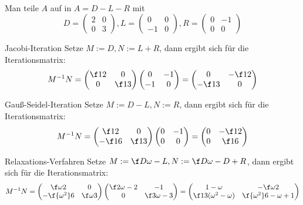 \documentclass{mywork}
\begin{document}
	\begin{aufgabe}~

		Man teile $A$ auf in $A= D - L - R$ mit
		\[
			D=\begin{pmatrix}2&0\\0&3\end{pmatrix},
			L=\begin{pmatrix}0&0\\-1&0\end{pmatrix},
			R=\begin{pmatrix}0&-1\\0&0\end{pmatrix}
		\]
		\begin{seg}{Jacobi-Iteration}
			Setze $M:=D, N:=L+R$, dann ergibt sich für die Iterationsmatrix:
			\[
				M^{-1}N = \begin{pmatrix}\f12&0\\0&\f13\end{pmatrix}\begin{pmatrix}0&-1\\-1&0\end{pmatrix} = \begin{pmatrix}0&-\f12\\-\f13&0\end{pmatrix}
			\]
		\end{seg}
		\begin{seg}{Gauß-Seidel-Iteration}
			Setze $M:=D-L, N:=R$, dann ergibt sich für die Iterationsmatrix:
			\[
				M^{-1}N = \begin{pmatrix}\f12&0\\-\f16&\f13\end{pmatrix}\begin{pmatrix}0&-1\\0&0\end{pmatrix} = \begin{pmatrix}0&-\f12\\0&\f16\end{pmatrix}
			\]
		\end{seg}
		\begin{seg}{Relaxations-Verfahren}
			Setze $M:=\f D\omega -L, N:= \f D\omega -D + R$, dann ergibt sich für die Iterationsmatrix:
			\[
				M^{-1}N = \begin{pmatrix}\f \omega2 & 0\\-\f{\omega^2}6 & \f\omega3\end{pmatrix}\begin{pmatrix}\f2\omega-2&-1\\0&\f3\omega-3\end{pmatrix} = \begin{pmatrix}1-\omega & -\f\omega2\\\f13(\omega^2-\omega)&\f{\omega^2}6-\omega +1\end{pmatrix}
			\]
		\end{seg}


\end{aufgabe}
\end{document}
